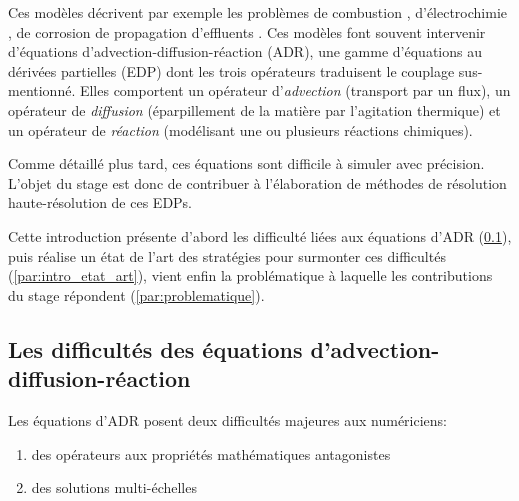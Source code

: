 Ces modèles décrivent par exemple les problèmes de combustion \cite{Law2006,Echekki2009}, d'électrochimie \cite{Munteanu2024SPM}, de corrosion \cite{AliasgharMamaghani2025}
de propagation d'effluents \cite{exemple_effluent}.
Ces modèles font souvent intervenir d'équations d'advection-diffusion-réaction (ADR), 
une gamme d'équations au dérivées partielles (EDP) dont les trois opérateurs traduisent le couplage sus-mentionné.
Elles comportent un opérateur d'\emph{advection} (transport par un flux), un opérateur de \emph{diffusion} (éparpillement de la matière par l'agitation thermique) 
et un opérateur de \emph{réaction} (modélisant une ou plusieurs réactions chimiques).\par 
Comme détaillé plus tard, ces équations sont difficile à simuler avec précision. L'objet du stage est donc de contribuer à l'élaboration
de méthodes de résolution haute-résolution de ces EDPs.\par 
Cette introduction présente d'abord les difficulté liées aux équations d'ADR (\ref{par:difficulte_adr}), puis réalise un état de l'art des stratégies pour surmonter ces difficultés (\ref{par:intro_etat_art}),
vient enfin la problématique à laquelle les contributions du stage répondent (\ref{par:problematique}).

\subsection{Les difficultés des équations d'advection-diffusion-réaction}
    \label{par:difficulte_adr}
    Les équations d'ADR posent deux difficultés majeures aux numériciens:
    \begin{enumerate}[label=\Alph*.]
        \item des opérateurs aux propriétés mathématiques antagonistes
        \item des solutions multi-échelles
    \end{enumerate}
